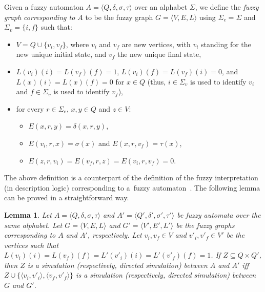 \documentclass[11pt]{article}
\def\tuple#1{\langle#1\rangle}
\newcommand{\SV}{\Sigma_v}
\newcommand{\SE}{\Sigma_e}
\newtheorem{lemma}[theorem]{Lemma}
\begin{document}
Given a fuzzy automaton $A = \tuple{Q,\delta,\sigma,\tau}$ over an alphabet $\Sigma$, we define the {\em fuzzy graph corresponding to $A$} to be the fuzzy graph $G = \tuple{V,E,L}$ using $\SE = \Sigma$ and $\SV = \{i,f\}$ such that:
\begin{itemize}
	\item $V = Q \cup \{v_i,v_f\}$, where $v_i$ and $v_f$ are new vertices, with $v_i$ standing for the new unique initial state, and $v_f$ the new unique final state, 
	\item $L(v_i)(i) = L(v_f)(f) = 1$, $L(v_i)(f) = L(v_f)(i) = 0$, and $L(x)(i) = L(x)(f) = 0$ for $x \in Q$ (thus, $i \in \SV$ is used to identify $v_i$ and $f \in \SV$ is used to identify $v_f$), 
	\item for every $r \in \SE$, $x,y \in Q$ and $z \in V$: 
	\begin{itemize} 
		\item $E(x,r,y) = \delta(x,r,y)$, 
		\item $E(v_i,r,x) = \sigma(x)$ and $E(x,r,v_f) = \tau(x)$, 
		\item $E(z,r,v_i) = E(v_f,r,z) = E(v_i,r,v_f) = 0$. 
	\end{itemize}
\end{itemize}

The above definition is a counterpart of the definition of the fuzzy interpretation (in description logic) corresponding to a~fuzzy automaton~\cite{TFS2020}. 
%
The following lemma can be proved in a straightforward way. 

\begin{lemma}\label{lemma: HJHSA}
Let $A = \tuple{Q,\delta,\sigma,\tau}$ and $A' = \tuple{Q',\delta',\sigma',\tau'}$ be fuzzy automata over the same alphabet. 
Let $G = \tuple{V,E,L}$ and $G' = \tuple{V',E',L'}$ be the fuzzy graphs corresponding to $A$ and $A'$, respectively. 
Let $v_i, v_f \in V$ and $v'_i, v'_f \in V'$ be the vertices such that $L(v_i)(i) = L(v_f)(f) = L'(v'_i)(i) = L'(v'_f)(f) = 1$. If $Z \subseteq Q \times Q'$, then $Z$ is a simulation (respectively, directed simulation) between $A$ and $A'$ iff $Z \cup \{\tuple{v_i,v'_i},\tuple{v_f,v'_f}\}$ is a simulation (respectively, directed simulation) between $G$ and $G'$.  
\end{lemma}

\newcommand{\AlgorithmSimFA}{Algorithm~\ref{alg: ComputeSimulationEfficiently}'\xspace}
\newcommand{\AlgorithmDirSimFA}{Algorithm~\ref{alg: ComputeDirectedSimulationEfficiently}'\xspace}
\end{document}
